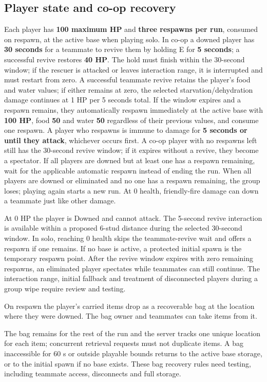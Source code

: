 \subsection{Player state and co-op recovery}
Each player has \textbf{100 maximum HP} and \textbf{three respawns per run}, consumed on respawn, at the active base when playing solo. In co-op a downed player has \textbf{30 seconds} for a teammate to revive them by holding E for \textbf{5 seconds}; a successful revive restores \textbf{40 HP}. The hold must finish within the 30-second window; if the rescuer is attacked or leaves interaction range, it is interrupted and must restart from zero. A successful teammate revive retains the player's food and water values; if either remains at zero, the selected starvation/dehydration damage continues at 1 HP per 5 seconds total. If the window expires and a respawn remains, they automatically respawn immediately at the active base with \textbf{100 HP}, food \textbf{50} and water \textbf{50} regardless of their previous values, and consume one respawn. A player who respawns is immune to damage for \textbf{5 seconds or until they attack}, whichever occurs first. A co-op player with no respawns left still has the 30-second revive window; if it expires without a revive, they become a spectator. If all players are downed but at least one has a respawn remaining, wait for the applicable automatic respawn instead of ending the run. When all players are downed or eliminated and no one has a respawn remaining, the group loses; playing again starts a new run. At 0 health, friendly-fire damage can down a teammate just like other damage.

At 0 HP the player is Downed and cannot attack. The 5-second revive interaction is available within a proposed 6-stud distance during the selected 30-second window. In solo, reaching 0 health skips the teammate-revive wait and offers a respawn if one remains. If no base is active, a protected initial spawn is the temporary respawn point. After the revive window expires with zero remaining respawns, an eliminated player spectates while teammates can still continue. The interaction range, initial fallback and treatment of disconnected players during a group wipe require review and testing.

On respawn the player's carried items drop as a recoverable bag at the location where they were downed. The bag owner and teammates can take items from it.

The bag remains for the rest of the run and the server tracks one unique location for each item; concurrent retrieval requests must not duplicate items. A bag inaccessible for 60 s or outside playable bounds returns to the active base storage, or to the initial spawn if no base exists. These bag recovery rules need testing, including teammate access, disconnects and full storage.


